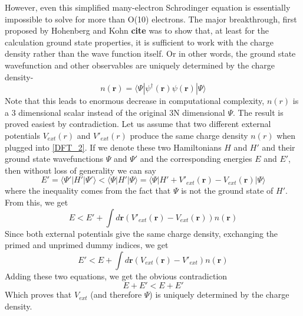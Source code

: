 \documentclass[12pt,a4paper]{article}
\newcommand{\Ps}{\Psi}
\newcommand{\ps}{\psi}
\newcommand{\da}{\dagger}
\newcommand{\la}{\langle}
\newcommand{\ra}{\rangle}
\newcommand{\rmb}{\mathbf{r}}
\begin{document}
However, even this simplified many-electron Schrodinger equation is essentially impossible to solve for more than O(10) electrons. The major breakthrough, first proposed by Hohenberg and Kohn \textbf{cite} was to show that, at least for the calculation ground state properties, it is sufficient to work with the charge density rather than the wave function itself. Or in other words, the ground state wavefunction and other observables are uniquely determined  by the charge density-
\begin{equation}
n(\rmb)= \la \Ps|\ps^\da (\rmb) \ps(\rmb) | \Ps\ra 
\end{equation}
Note that this leads to enormous decrease in computational complexity, $n(r)$ is a 3 dimensional scalar instead of the original 3N dimensional $\Ps$.  The result is proved easiest by contradiction. Let us assume that two different external potentials $V_{ext} (r)$ and $V'_{ext} (r)$ produce the same charge density $n(r)$
when plugged into \ref{DFT_2}. If we denote these two Hamiltonians $H$ and $H'$ and their ground state wavefunctions $\Ps$ and $\Ps'$ and the corresponding energies $E$ and $E'$, then without loss of generality we can say
\begin{equation}
E'=\la \Ps' | H' |\Ps' \ra < \la \Ps | H' |\Ps \ra = \la \Ps | H' + V'_{ext} (\rmb) -V_{ext} (\rmb)   |\Ps \ra
\end{equation}
where the inequality comes from the fact that $\Ps$ is not the ground state of $H'$. From this, we get
\begin{equation}
E < E' + \int d\rmb \left( V'_{ext} (\rmb) -V_{ext}(\rmb) \right) n(\rmb)
\end{equation}
Since both external potentials give the same charge density, exchanging the primed and unprimed dummy indices, we get
\begin{equation}
E' < E + \int d\rmb \left( V_{ext} (\rmb) -V'_{ext} \right) n(\rmb)
\end{equation}
Adding these two equations, we get the obvious contradiction
\begin{equation}
E+E' < E+E'
\end{equation}
 Which proves that $V_{ext}$ (and therefore $\Ps$) is uniquely determined by the charge density.
\end{document}
